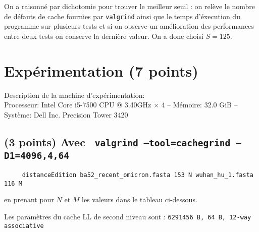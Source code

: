 \documentclass[10pt,a4paper]{article}
\begin{document}
On a raisonné par dichotomie pour trouver le meilleur seuil : on relève le nombre de défauts de cache fournies par \texttt{valgrind} ainsi que le temps d'éxecution du programme sur plusieurs tests et si on observe un amélioration des performances entre deux tests on conserve la dernière valeur. On a donc choisi $S=125$.

\section{Expérimentation (7 points)}

Description de la machine d'expérimentation:  \\
Processeur: Intel Core i5-7500 CPU @ 3.40GHz × 4 --
Mémoire: 32.0 GiB --
Système: Dell Inc. Precision Tower 3420

\subsection{(3 points) Avec {\tt 
	valgrind --tool=cachegrind --D1=4096,4,64
}} 
\begin{verbatim}
     distanceEdition ba52_recent_omicron.fasta 153 N wuhan_hu_1.fasta 116 M 
\end{verbatim}
en prenant pour $N$ et $M$ les valeurs dans le tableau ci-dessous.

\medskip

Les paramètres du cache LL de second niveau sont : \texttt{6291456 B, 64 B, 12-way associative}

\medskip
\end{document}
